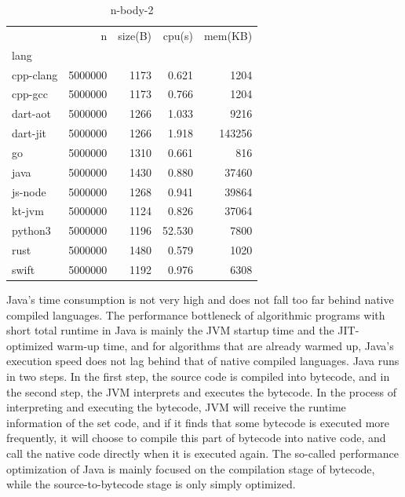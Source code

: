 \begin{table}[ht]
    \caption{n-body-2}
    \label{tab:n-body-2}
    \begin{center}
        \begin{tabular}{lrrrr}
            \toprule
            {}        & n       & size(B) & cpu(s) & mem(KB) \\
            lang      &         &         &        &         \\
            \midrule
            cpp-clang & 5000000 & 1173    & 0.621  & 1204    \\
            cpp-gcc   & 5000000 & 1173    & 0.766  & 1204    \\
            dart-aot  & 5000000 & 1266    & 1.033  & 9216    \\
            dart-jit  & 5000000 & 1266    & 1.918  & 143256  \\
            go        & 5000000 & 1310    & 0.661  & 816     \\
            java      & 5000000 & 1430    & 0.880  & 37460   \\
            js-node   & 5000000 & 1268    & 0.941  & 39864   \\
            kt-jvm    & 5000000 & 1124    & 0.826  & 37064   \\
            python3   & 5000000 & 1196    & 52.530 & 7800    \\
            rust      & 5000000 & 1480    & 0.579  & 1020    \\
            swift     & 5000000 & 1192    & 0.976  & 6308    \\
            \bottomrule
        \end{tabular}
    \end{center}
\end{table}


Java's time consumption is not very high and does not fall too far behind native compiled languages. The performance bottleneck of algorithmic programs with short total runtime in Java is mainly the JVM startup time and the JIT-optimized warm-up time, and for algorithms that are already warmed up, Java's execution speed does not lag behind that of native compiled languages. Java runs in two steps. In the first step, the source code is compiled into bytecode, and in the second step, the JVM interprets and executes the bytecode. In the process of interpreting and executing the bytecode, JVM will receive the runtime information of the set code, and if it finds that some bytecode is executed more frequently, it will choose to compile this part of bytecode into native code, and call the native code directly when it is executed again. The so-called performance optimization of Java is mainly focused on the compilation stage of bytecode, while the source-to-bytecode stage is only simply optimized.

